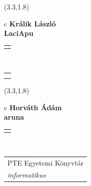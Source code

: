 \documentclass[11pt]{article}
\begin{document}
\makebox(3.3,1.8){
  \renewcommand\arraystretch{1.3}
  \begin{tabular}[c]{c}
    \hspace{8.5mm}
    \LARGE\bf{ Králik László }\\
    \hspace{8.5mm}
    \Large{ LaciApu }\\
    \renewcommand\arraystretch{3}
    \begin{tabular}[c]{c}
      \centering
      \fontfamily{phv}\selectfont{
        \textbf{
          \textsc{
            \scriptsize{
            \color{Bright}{ Ismerkedő }\color{Dark}{ Webmester }\color{Bright}{ Sminkmester }\color{Dark}{ Programozó }
            }
          }
        }
      }
    \end{tabular}
    \\
    \renewcommand\arraystretch{1}
    \begin{tabular}{p{3.3in}}
      \hspace{.7cm}\\
      \hspace{.7cm}\emph{  }\\
    \end{tabular}
  \end{tabular}
}

\makebox(3.3,1.8){
  \renewcommand\arraystretch{1.3}
  \begin{tabular}[c]{c}
    \hspace{8.5mm}
    \LARGE\bf{ Horváth Ádám }\\
    \hspace{8.5mm}
    \Large{ aruna }\\
    \renewcommand\arraystretch{3}
    \begin{tabular}[c]{c}
      \centering
      \fontfamily{phv}\selectfont{
        \textbf{
          \textsc{
            \scriptsize{
            \color{Bright}{ Ismerkedő }\color{Bright}{ Webmester }\color{Bright}{ Sminkmester }\color{Dark}{ Programozó }
            }
          }
        }
      }
    \end{tabular}
    \\
    \renewcommand\arraystretch{1}
    \begin{tabular}{p{3.3in}}
      \hspace{.7cm}PTE Egyetemi Könyvtár\\
      \hspace{.7cm}\emph{ informatikus }\\
    \end{tabular}
  \end{tabular}
}
\end{document}

